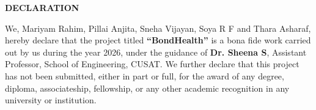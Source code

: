 \clearpage
{}
{}
\thispagestyle{footeronly}
\begin{center}
{\Large \textbf{DECLARATION}}
\end{center}

\justifying
\noindent
We, Mariyam Rahim, Pillai Anjita, Sneha Vijayan, 
Soya R F and Thara Asharaf, hereby declare that the project titled 
\textbf{``BondHealth''} 
is a bona fide work carried out by us during the year 2026, 
under the guidance of \textbf{Dr. Sheena S}, Assistant Professor, 
School of Engineering, CUSAT. We further declare that this project has not been submitted, 
either in part or full, for the award of any degree, diploma, 
associateship, fellowship, or any other academic recognition 
in any university or institution.

\vfill

\clearpage